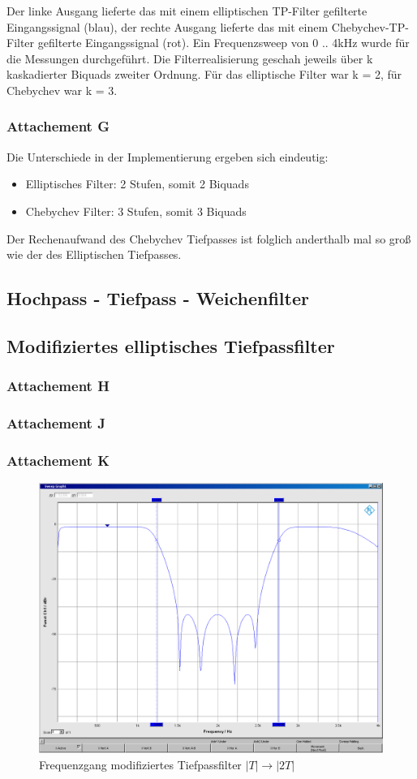 \noindent Der linke Ausgang lieferte das mit einem elliptischen TP-Filter gefilterte Eingangssignal (blau), der rechte Ausgang lieferte das mit einem Chebychev-TP-Filter gefilterte Eingangssignal (rot). Ein Frequenzsweep von 0 .. 4kHz wurde für die Messungen durchgeführt. Die Filterrealisierung geschah jeweils über k kaskadierter Biquads zweiter Ordnung. Für das elliptische Filter war k = 2, für Chebychev war k = 3.

\subsubsection{Attachement G}
\noindent Die Unterschiede in der Implementierung ergeben sich eindeutig:
\begin{itemize}
	\item Elliptisches Filter: 2 Stufen, somit 2 Biquads
	\item Chebychev Filter: 3 Stufen, somit 3 Biquads
\end{itemize}
\noindent Der Rechenaufwand des Chebychev Tiefpasses ist folglich anderthalb mal so groß wie der des Elliptischen Tiefpasses.

\clearpage

\subsection{Hochpass - Tiefpass - Weichenfilter}



\subsection{Modifiziertes elliptisches Tiefpassfilter}
\subsubsection{Attachement H}


\subsubsection{Attachement J}


\subsubsection{Attachement K}

	\begin{figure}[h]
		\centering
		\includegraphics[width=0.7\linewidth]{Bilder/ellip2T}
		\caption{Frequenzgang modifiziertes Tiefpassfilter $|T| \rightarrow |2T|$}
		\label{fig:ellip2T}
	\end{figure}
